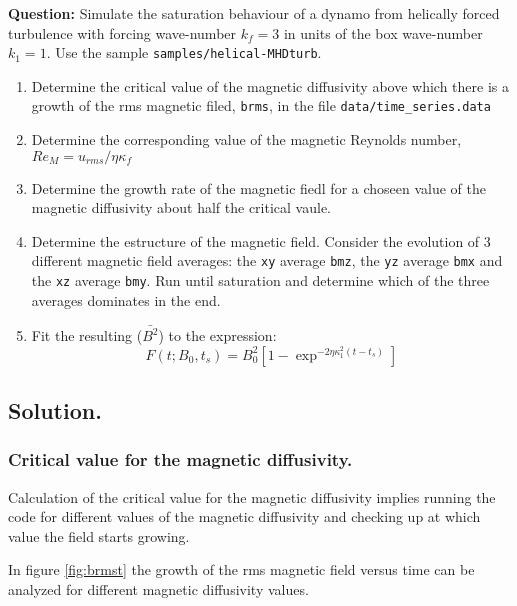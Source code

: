 
\textbf{Question:} Simulate the saturation behaviour of a dynamo from helically forced turbulence with forcing wave-number $k_f = 3$ in units of the box wave-number $k_1 = 1$. Use the sample  \texttt{samples/helical-MHDturb}.
\begin{enumerate}
 \item Determine the critical value of the magnetic diffusivity above which there is a growth of the rms magnetic filed, \verb|brms|, in the file \verb|data/time_series.data|
\item Determine the corresponding value of the magnetic Reynolds number, $Re_M = u_{rms}/\eta \kappa_f$
\item Determine the growth rate of the magnetic fiedl for a choseen value of the magnetic diffusivity about half the critical vaule. 
\item Determine the estructure of the magnetic field. Consider the evolution of 3 different magnetic field averages: the \verb|xy| average \verb|bmz|, the \verb|yz| average \verb|bmx| and the \verb|xz| average \verb|bmy|. Run until saturation and determine which of the three averages dominates in the end.
\item Fit the resulting ($\bar{B^2}$) to the expression:
\begin{equation}
 F(t;B_0,t_s)=B_0^2[1-\exp^{-2\eta\kappa_1^2(t-t_s)}]
\label{eq:fitB}
\end{equation}
\end{enumerate}

\subsection{Solution.}

\subsubsection{Critical value for the magnetic diffusivity.}

Calculation of the critical value for the magnetic diffusivity implies running the code for different values of the magnetic diffusivity and checking up at which value the field starts growing.

In figure \ref{fig:brmst} the growth of the rms magnetic field versus time can be analyzed for different magnetic diffusivity values.

